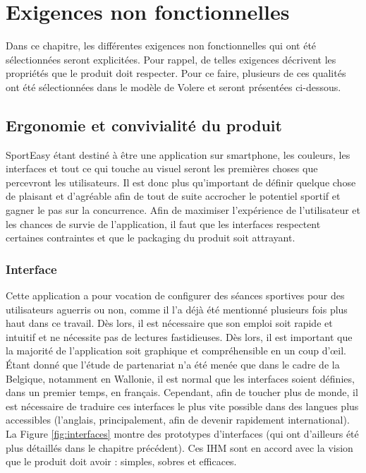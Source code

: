 \chapter{Exigences non fonctionnelles}
Dans ce chapitre, les différentes exigences non fonctionnelles qui ont été sélectionnées seront explicitées. Pour rappel, de telles exigences décrivent les propriétés que le produit doit respecter. Pour ce faire, plusieurs de ces qualités ont été sélectionnées dans le modèle de Volere et seront présentées ci-dessous.

\section{Ergonomie et convivialité du produit}
SportEasy étant destiné à être une application sur smartphone, les couleurs, les interfaces et tout ce qui touche au visuel seront les premières choses que percevront les utilisateurs. Il est donc plus qu'important de définir quelque chose de plaisant et d'agréable afin de tout de suite accrocher le potentiel sportif et gagner le pas sur la concurrence. Afin de maximiser l'expérience de l'utilisateur et les chances de survie de l'application, il faut que les interfaces respectent certaines contraintes et que le packaging du produit soit attrayant.

\subsection*{Interface}
Cette application a pour vocation de configurer des séances sportives pour des utilisateurs aguerris ou non, comme il l'a déjà été mentionné plusieurs fois plus haut dans ce travail. Dès lors, il est nécessaire que son emploi soit rapide et intuitif et ne nécessite pas de lectures fastidieuses. Dès lors, il est important que la majorité de l'application soit graphique et compréhensible en un coup d'\oe il.\\

\'Etant donné que l'étude de partenariat n'a été menée que dans le cadre de la Belgique, notamment en Wallonie, il est normal que les interfaces soient définies, dans un premier temps, en français. Cependant, afin de toucher plus de monde, il est nécessaire de traduire ces interfaces le plus vite possible dans des langues plus accessibles (l'anglais, principalement, afin de devenir rapidement international).\\

La Figure \ref{fig:interfaces} montre des prototypes d'interfaces (qui ont d'ailleurs été plus détaillés dans le chapitre précédent). Ces IHM sont en accord avec la vision que le produit doit avoir : simples, sobres et efficaces.

